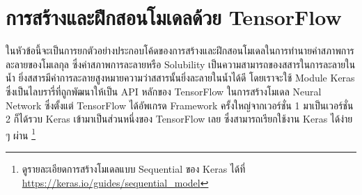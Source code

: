 \section{การสร้างและฝึกสอนโมเดลด้วย TensorFlow}
\label{sec:train_tf}

ในหัวข้อนี้จะเป็นการยกตัวอย่างประกอบโค้ดของการสร้างและฝึกสอนโมเดลในการทำนายค่าสภาพการละลายของโมเลกุล ซึ่งค่าสภาพการละลายหรือ
Solubility เป็นความสามารถของสสารในการละลายในน้ำ ยิ่งสสารมีค่าการละลายสูงหมายความว่าสสารนั้นยิ่งละลายในน้ำได้ดี โดยเราจะใช้ Module 
Keras ซึ่งเป็นไลบรารี่ที่ถูกพัฒนาให้เป็น API หลักของ TensorFlow ในการสร้างโมเดล Neural Network ซึ่งตั้งแต่ TensorFlow ได้อัพเกรด 
Framework ครั้งใหญ่จากเวอร์ชั่น 1 มาเป็นเวอร์ชั่น 2 ก็ได้รวบ Keras เข้ามาเป็นส่วนหนึ่งของ TensorFlow เลย ซึ่งสามารถเรียกใช้งาน Keras 
ได้ง่าย ๆ ผ่าน \footnote{ดูรายละเอียดการสร้างโมเดลแบบ Sequential ของ Keras ได้ที่ 
\url{https://keras.io/guides/sequential_model}}

